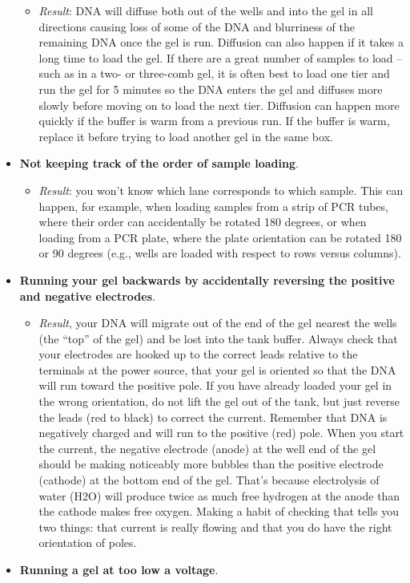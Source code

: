 \documentclass[
  letterpaper,
  DIV=11,
  numbers=noendperiod]{scrreprt}
\providecommand{\tightlist}{%
  \setlength{\itemsep}{0pt}\setlength{\parskip}{0pt}}\usepackage{longtable,booktabs,array}
\begin{document}
\begin{itemize}
  \begin{itemize}
  \tightlist
  \item
    \emph{Result}: DNA will diffuse both out of the wells and into the
    gel in all directions causing loss of some of the DNA and blurriness
    of the remaining DNA once the gel is run. Diffusion can also happen
    if it takes a long time to load the gel. If there are a great number
    of samples to load -- such as in a two- or three-comb gel, it is
    often best to load one tier and run the gel for 5 minutes so the DNA
    enters the gel and diffuses more slowly before moving on to load the
    next tier. Diffusion can happen more quickly if the buffer is warm
    from a previous run. If the buffer is warm, replace it before trying
    to load another gel in the same box.
  \end{itemize}
\item
  \textbf{Not keeping track of the order of sample loading}.

  \begin{itemize}
  \tightlist
  \item
    \emph{Result}: you won't know which lane corresponds to which
    sample. This can happen, for example, when loading samples from a
    strip of PCR tubes, where their order can accidentally be rotated
    180 degrees, or when loading from a PCR plate, where the plate
    orientation can be rotated 180 or 90 degrees (e.g., wells are loaded
    with respect to rows versus columns).
  \end{itemize}
\item
  \textbf{Running your gel backwards by accidentally reversing the
  positive and negative electrodes}.

  \begin{itemize}
  \tightlist
  \item
    \emph{Result}, your DNA will migrate out of the end of the gel
    nearest the wells (the ``top'' of the gel) and be lost into the tank
    buffer. Always check that your electrodes are hooked up to the
    correct leads relative to the terminals at the power source, that
    your gel is oriented so that the DNA will run toward the positive
    pole. If you have already loaded your gel in the wrong orientation,
    do not lift the gel out of the tank, but just reverse the leads (red
    to black) to correct the current. Remember that DNA is negatively
    charged and will run to the positive (red) pole. When you start the
    current, the negative electrode (anode) at the well end of the gel
    should be making noticeably more bubbles than the positive electrode
    (cathode) at the bottom end of the gel. That's because electrolysis
    of water (H2O) will produce twice as much free hydrogen at the anode
    than the cathode makes free oxygen. Making a habit of checking that
    tells you two things: that current is really flowing and that you do
    have the right orientation of poles.
  \end{itemize}
\item
  \textbf{Running a gel at too low a voltage}.


\end{itemize}
\end{document}
